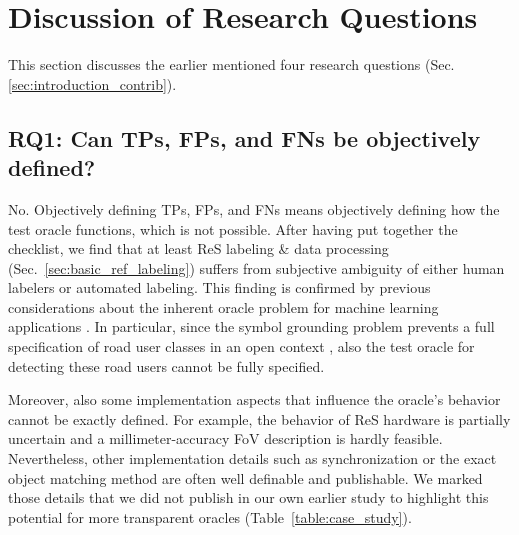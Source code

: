 \documentclass[conference]{IEEEtran}
\begin{document}
\section{Discussion of Research Questions}
\label{sec:discussion}


This section discusses the earlier mentioned four research questions (Sec. \ref{sec:introduction_contrib}). 


\subsection{RQ1: Can TPs, FPs, and FNs be objectively defined?}
\label{sec:discussion_rq1}

No. Objectively defining TPs, FPs, and FNs means objectively defining how the test oracle functions, which is not possible. After having put together the checklist, we find that at least ReS labeling \& data processing (Sec.~\ref{sec:basic_ref_labeling}) suffers from subjective ambiguity of either human labelers or automated labeling. 
This finding is confirmed by previous considerations about the inherent oracle problem for machine learning applications \cite{Abrecht2021testing}. 
In particular, since the symbol grounding problem prevents a full specification of road user classes in an open context \cite{Salay2019partialspecifications, Abrecht2021testing}, also the test oracle for detecting these road users cannot be fully specified.

Moreover, also some implementation aspects that influence the oracle's behavior cannot be exactly defined.
For example, the behavior of ReS hardware is partially uncertain and a millimeter-accuracy FoV description is hardly feasible.
Nevertheless, other implementation details such as synchronization or the exact object matching method are often well definable and publishable.
We marked those details that we did not publish in our own earlier study to highlight this potential for more transparent oracles (Table~\ref{table:case_study}). 





\end{document}
